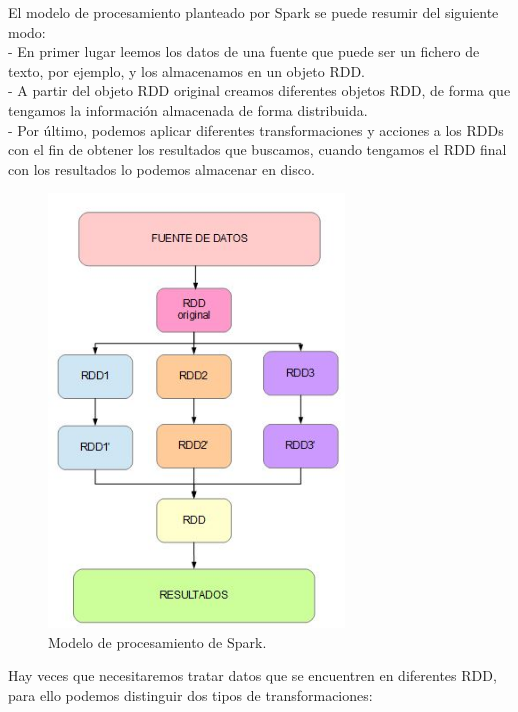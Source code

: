 El modelo de procesamiento planteado por Spark se puede resumir del siguiente modo:\\

- En primer lugar leemos los datos de una fuente que puede ser un fichero de texto, por ejemplo, y los almacenamos en un objeto RDD.\\

- A partir del objeto RDD original creamos diferentes objetos RDD, de forma que tengamos la información almacenada de forma distribuida.\\
	
- Por último, podemos aplicar diferentes transformaciones  y acciones a los RDDs con el fin de obtener los resultados que buscamos, cuando tengamos el RDD final con los resultados lo podemos almacenar en disco.	

\begin{figure}[H]
	\centering
	\includegraphics[width=0.7\textwidth]{./imagenes/programacion_spark}
	\caption{Modelo de procesamiento de Spark.} 
	
\end{figure}

Hay veces que necesitaremos tratar datos que se encuentren en diferentes RDD, para ello podemos distinguir dos tipos de transformaciones:\\

